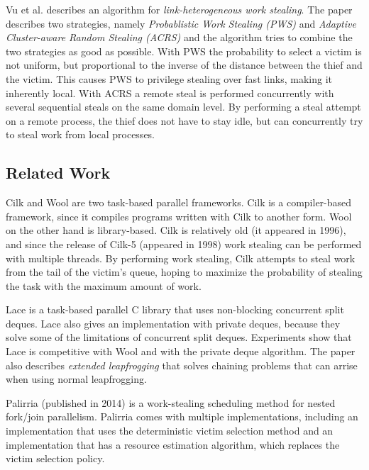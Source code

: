 Vu et al. \cite{6846471} describes an algorithm for \emph{link-heterogeneous work stealing}. The paper describes two strategies, namely \emph{Probablistic Work Stealing (PWS)} and \emph{Adaptive Cluster-aware Random Stealing (ACRS)} and the algorithm tries to combine the two strategies as good as possible. With PWS the probability to select a victim is not uniform, but proportional to the inverse of the distance between the thief and the victim. This causes PWS to privilege stealing over fast links, making it inherently local. With ACRS a remote steal is performed concurrently with several sequential steals on the same domain level. By performing a steal attempt on a remote process, the thief does not have to stay idle, but can concurrently try to steal work from local processes. 

\subsection{Related Work}
Cilk and Wool \cite{blumofe1996cilk, faxen2009wool} are two task-based parallel frameworks. Cilk is a compiler-based framework, since it compiles programs written with Cilk to another form. Wool on the other hand is library-based. Cilk is relatively old (it appeared in 1996), and since the release of Cilk-5 \cite{frigo1998implementation} (appeared in 1998) work stealing can be performed with multiple threads. By performing work stealing, Cilk attempts to steal work from the tail of the victim's queue, hoping to maximize the probability of stealing the task with the maximum amount of work.

Lace \cite{lace} is a task-based parallel C library that uses non-blocking concurrent split deques. Lace also gives an implementation with private deques, because they solve some of the limitations of concurrent split deques. Experiments show that Lace is competitive with Wool and with the private deque algorithm. The paper also describes \emph{extended leapfrogging} that solves chaining problems that can arrise when using normal leapfrogging.

Palirria \cite{varisteas2014palirria} (published in 2014) is a work-stealing scheduling method for nested fork/join parallelism. Palirria comes with multiple implementations, including an implementation that uses the deterministic victim selection method and an implementation that has a resource estimation algorithm, which replaces the victim selection policy.